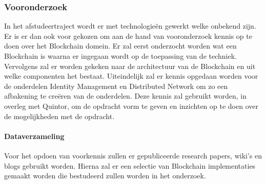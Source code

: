\subsubsection{Vooronderzoek}

In het afstudeertraject wordt er met technologieën gewerkt welke onbekend zijn. Er is er dan ook voor gekozen om aan de hand van vooronderzoek kennis op te doen over het Blockchain domein. Er zal eerst onderzocht worden wat een Blockchain is waarna er ingegaan wordt op de toepassing van de techniek. Vervolgens zal er worden gekeken naar de architectuur van de Blockchain en uit welke componenten het bestaat. Uiteindelijk zal er kennis opgedaan worden voor de onderdelen Identity Management en Distributed Network om zo een afbakening te creëren van de onderdelen. Deze kennis zal gebruikt worden, in overleg met Quintor, om de opdracht vorm te geven en inzichten op te doen over de mogelijkheden met de opdracht. 

\paragraph{Dataverzameling}
Voor het opdoen van voorkennis zullen er gepubliceerde research papers, wiki’s en blogs gebruikt worden. Hierna zal er een selectie van Blockchain implementaties gemaakt worden die bestudeerd zullen worden in het onderzoek.
